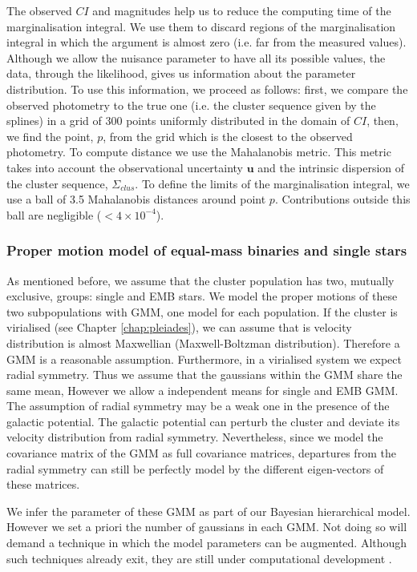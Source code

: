 The observed $CI$ and magnitudes help us  to reduce the computing time of the marginalisation integral. We use them to discard  regions of the marginalisation integral in which the argument is almost zero (i.e. far from the measured values). Although we allow the nuisance parameter to have all its possible values, the data, through the likelihood, gives us information about the parameter distribution. To use this information, we proceed as follows: first, we compare the observed photometry to the true one (i.e. the cluster sequence given by the splines) in a grid of 300 points uniformly distributed in the domain of $CI$, then, we find the point, $p$, from the grid which is  the closest to the observed photometry. To compute distance we use the Mahalanobis metric. This metric takes into account the observational uncertainty $\mathbf{u}$ and the intrinsic dispersion of the cluster sequence, $\Sigma_{clus}$. To define the limits of the marginalisation integral, we use a ball of 3.5 Mahalanobis distances around point $p$. Contributions outside this ball are negligible ($< 4\times10^{-4}$).

\subsubsection{Proper motion model of equal-mass binaries and single stars}
As mentioned before, we assume that the cluster population has two, mutually exclusive, groups: single and EMB stars.
We model the proper motions of these two subpopulations with GMM, one model for each population. If the cluster is virialised (see Chapter \ref{chap:pleiades}), we can assume that is velocity distribution is almost Maxwellian (Maxwell-Boltzman distribution). Therefore a GMM is a reasonable assumption. Furthermore, in a virialised system we expect radial symmetry. Thus we assume that the gaussians within the GMM share the same mean, However we allow a independent means for single and EMB GMM. The assumption of radial symmetry may be a weak one in the presence of the galactic potential. The galactic potential can perturb the cluster and deviate its velocity distribution from radial symmetry. Nevertheless, since we model the covariance matrix of the GMM as full covariance matrices, departures from the radial symmetry can still be perfectly model by the different eigen-vectors of these matrices.


We infer the parameter of these GMM as part of our Bayesian hierarchical model. However we set a priori the number of gaussians in each GMM. Not doing so will demand a technique in which the model parameters can be augmented. Although such techniques already exit, they are still under computational development \cite[see][for a review of reversible jump MCMC]{Fan2011}.

